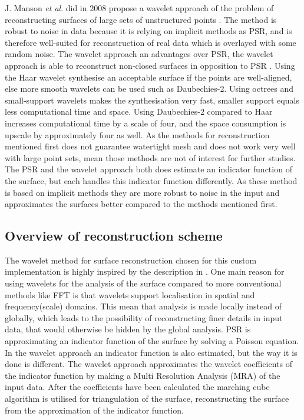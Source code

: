 J. Manson \textit{et al}. did in 2008 propose a wavelet approach of the problem of reconstructing surfaces of large sets of unstructured points \cite{Manson2008}. The method is robust to noise in data because it is relying on implicit methods as PSR, and is therefore well-suited for reconstruction of real data which is overlayed with some random noise. The wavelet approach an advantages over PSR, the wavelet approach is able to reconstruct non-closed surfaces in opposition to PSR \cite{Kazhdan2006}. Using the Haar wavelet synthesise an acceptable surface if the points are well-aligned, else more smooth wavelets can be used such as Daubechies-2. Using octrees and small-support wavelets makes the synthesisation very fast, smaller support equals less computational time and space. Using Daubechies-2 compared to Haar increases computational time by a scale of four, and the space consumption is upscale by approximately four as well. As the methods for reconstruction mentioned first does not guarantee watertight mesh and does not work very well with large point sets, mean those methods are not of interest for further studies. The PSR and the wavelet approach both does estimate an indicator function of the surface, but each handles this indicator function differently. As these method is based on implicit methods they are more robust to noise in the input and approximates the surfaces better compared to the methods mentioned first.

\subsection{Overview of reconstruction scheme}
The wavelet method for surface reconstruction chosen for this custom implementation is highly inspired by the description in \cite{Manson2008}. One main reason for using wavelets for the analysis of the surface compared to more conventional methods like FFT is that wavelets support localisation in spatial and frequency(scale) domains. This mean that analysis is made locally instead of globally, which leads to the possibility of reconstructing finer details in input data, that would otherwise be hidden by the global analysis. PSR is approximating an indicator function of the surface by solving a Poisson equation. In the wavelet approach an indicator function is also estimated, but the way it is done is different. The wavelet approach approximates the wavelet coefficients of the indicator function by making a Multi Resolution Analysis (MRA) of the input data. After the coefficients have been calculated the marching cube algorithm is utilised for triangulation of the surface, reconstructing the surface from the approximation of the indicator function.

